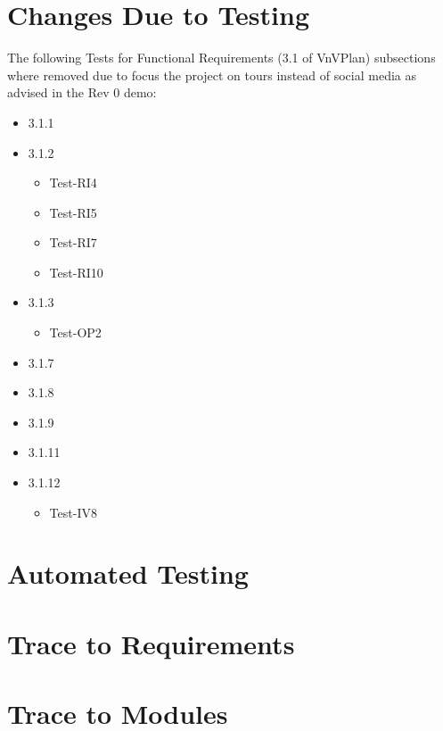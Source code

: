 \documentclass[12pt, titlepage]{article}
\begin{document}
\section{Changes Due to Testing}


The following Tests for Functional Requirements (3.1 of VnVPlan) subsections where removed due to focus the project on tours instead of social media as advised in the Rev 0 demo:
\begin{itemize}
    \item 3.1.1
    \item 3.1.2
        \begin{itemize}
            \item Test-RI4
            \item Test-RI5
            \item Test-RI7
            \item Test-RI10
        \end{itemize}
    \item 3.1.3
        \begin{itemize}
            \item Test-OP2
        \end{itemize}
    \item 3.1.7
    \item 3.1.8
    \item 3.1.9
    \item 3.1.11
    \item 3.1.12
        \begin{itemize}
            \item Test-IV8
        \end{itemize}
\end{itemize}

\section{Automated Testing}

\section{Trace to Requirements}

\section{Trace to Modules}
\end{document}
